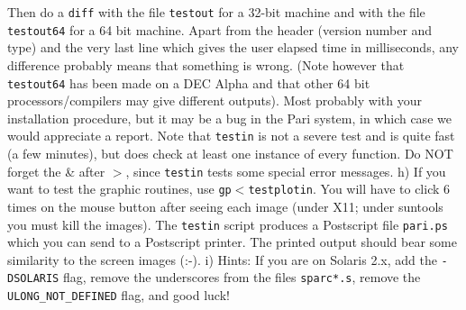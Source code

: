       Then do a {\tt diff} with the file {\tt testout} for a 32-bit
      machine and with the file {\tt testout64} for a 64 bit machine.
      Apart from the header (version number and type) and the very last
      line which gives the user elapsed time in milliseconds, any
      difference probably means that something is wrong. (Note however
      that {\tt testout64} has been made on a DEC Alpha and that other 64
      bit processors/compilers may give different outputs). 
      Most probably with your installation procedure, but
      it may be a bug in the Pari system, in which case we would appreciate a
      report. Note that {\tt testin} is not a severe test and is quite fast
      (a few minutes), but does check at least one instance of every function.
      Do NOT forget the \& after $>$, since {\tt testin} tests some special
      error messages. 
\medskip
   h) If you want to test the graphic routines, use 
      {\tt gp$<$testplotin}. You will have to click 6 times on the mouse
      button after seeing each image (under X11; under suntools you must kill
      the images). The {\tt testin} script produces a Postscript file 
      {\tt pari.ps} which you can send to a Postscript printer. The printed
      output should bear some similarity to the screen images (:-).
\medskip
   i) Hints: If you are on Solaris 2.x, add the {\tt -DSOLARIS} flag, remove the
      underscores  from the files {\tt sparc*.s}, remove the 
      {\tt ULONG\_NOT\_DEFINED} flag, and good luck!

